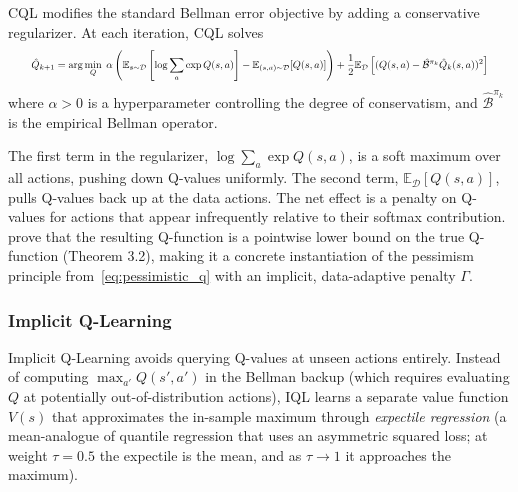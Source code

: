 \begin{definition}
\label{def:cql}
CQL modifies the standard Bellman error objective by adding a conservative regularizer. At each iteration, CQL solves
\begin{equation}
\label{eq:cql}
\resizebox{.95\linewidth}{!}{$\displaystyle
\hat{Q}_{k+1} = \arg\min_Q \; \alpha \left(\mathbb{E}_{s \sim \mathcal{D}}\left[\log \sum_{a} \exp Q(s,a)\right] - \mathbb{E}_{(s,a) \sim \mathcal{D}}[Q(s,a)]\right) + \frac{1}{2} \mathbb{E}_{\mathcal{D}}\left[(Q(s,a) - \hat{\mathcal{B}}^{\pi_k} \hat{Q}_k(s,a))^2\right]
$}
\end{equation}
where $\alpha > 0$ is a hyperparameter controlling the degree of conservatism, and $\hat{\mathcal{B}}^{\pi_k}$ is the empirical Bellman operator.
\end{definition}

The first term in the regularizer, $\log \sum_a \exp Q(s,a)$, is a soft maximum over all actions, pushing down Q-values uniformly. The second term, $\mathbb{E}_{\mathcal{D}}[Q(s,a)]$, pulls Q-values back up at the data actions. The net effect is a penalty on Q-values for actions that appear infrequently relative to their softmax contribution. \citet{Kumar2020} prove that the resulting Q-function is a pointwise lower bound on the true Q-function (Theorem 3.2), making it a concrete instantiation of the pessimism principle from~\eqref{eq:pessimistic_q} with an implicit, data-adaptive penalty $\Gamma$.

\subsubsection{Implicit Q-Learning}

Implicit Q-Learning \citep[IQL,][]{Kostrikov2022} avoids querying Q-values at unseen actions entirely. Instead of computing $\max_{a'} Q(s', a')$ in the Bellman backup (which requires evaluating $Q$ at potentially out-of-distribution actions), IQL learns a separate value function $V(s)$ that approximates the in-sample maximum through \textit{expectile regression} (a mean-analogue of quantile regression that uses an asymmetric squared loss; at weight $\tau = 0.5$ the expectile is the mean, and as $\tau \to 1$ it approaches the maximum).

